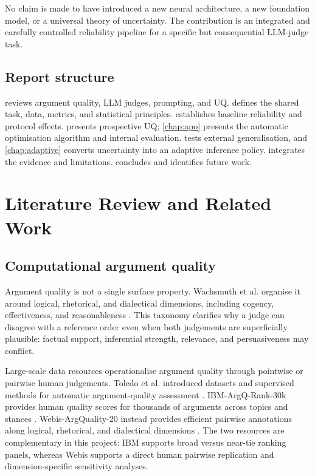 \documentclass[11pt,twoside,a4paper]{report}
\begin{document}
No claim is made to have introduced a new neural architecture, a new foundation
model, or a universal theory of uncertainty.  The contribution is an integrated and
carefully controlled reliability pipeline for a specific but consequential LLM-judge
task.

\section{Report structure}

 reviews argument quality, LLM judges, prompting, and UQ.
 defines the shared task, data, metrics, and statistical
principles.   establishes baseline reliability and protocol
effects.   presents prospective UQ; \cref{chap:apo} presents the
automatic optimisation algorithm and internal evaluation.  
tests external generalisation, and \cref{chap:adaptive} converts uncertainty into an
adaptive inference policy.   integrates the evidence and
limitations.   concludes and identifies future work.

\chapter{Literature Review and Related Work}
\label{chap:related-work}

\section{Computational argument quality}

Argument quality is not a single surface property.  Wachsmuth et al. organise it
around logical, rhetorical, and dialectical dimensions, including cogency,
effectiveness, and reasonableness \cite{wachsmuth2017computational}.  This taxonomy
clarifies why a judge can disagree with a reference order even when both judgements
are superficially plausible: factual support, inferential strength, relevance, and
persuasiveness may conflict.

Large-scale data resources operationalise argument quality through pointwise or
pairwise human judgements.  Toledo et al. introduced datasets and supervised methods
for automatic argument-quality assessment \cite{toledo2019automatic}.
IBM-ArgQ-Rank-30k provides human quality scores for thousands of arguments across
topics and stances \cite{gretz2020largescale}.  Webis-ArgQuality-20 instead provides
efficient pairwise annotations along logical, rhetorical, and dialectical
dimensions \cite{gienapp2020efficient}.  The two resources are complementary in this
project: IBM supports broad versus near-tie ranking panels, whereas Webis supports a
direct human pairwise replication and dimension-specific sensitivity analyses.
\end{document}
